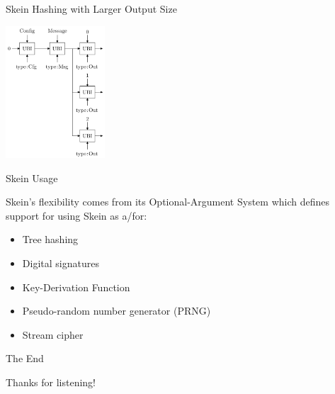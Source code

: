 \documentclass{beamer}
\begin{document}
\begin{frame}{Skein Hashing with Larger Output Size}

	\begin{center}\includegraphics[width=140px]{skein-large}\end{center}

\end{frame}

\begin{frame}{Skein Usage}

	Skein's flexibility comes from its Optional-Argument System which defines support for using Skein as a/for:

	\vspace{2mm}
	\begin{itemize}
		\item Tree hashing
		\item Digital signatures
		\item Key-Derivation Function
		\item Pseudo-random number generator (PRNG)
		\item Stream cipher
	\end{itemize}

\end{frame}

\begin{frame}{The End}

	Thanks for listening!

\end{frame}
\end{document}
